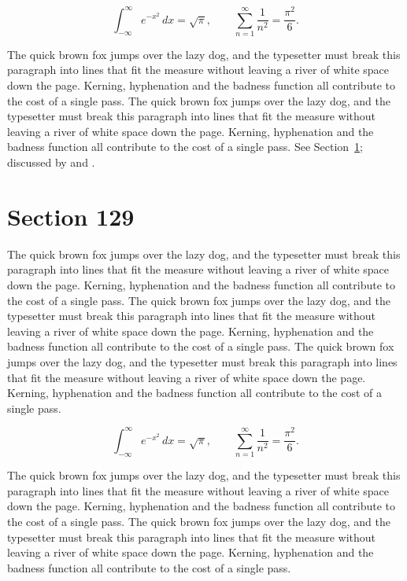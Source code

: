 \documentclass{article}
\begin{document}
\begin{equation}\label{eq:128}
\int_{-\infty}^{\infty} e^{-x^{2}}\,dx = \sqrt{\pi}, \qquad
\sum_{n=1}^{\infty} \frac{1}{n^{2}} = \frac{\pi^{2}}{6}.
\end{equation}

The quick brown fox jumps over the lazy dog, and the typesetter must break this paragraph into lines that fit the measure without leaving a river of white space down the page. Kerning, hyphenation and the badness function all contribute to the cost of a single pass. The quick brown fox jumps over the lazy dog, and the typesetter must break this paragraph into lines that fit the measure without leaving a river of white space down the page. Kerning, hyphenation and the badness function all contribute to the cost of a single pass. 
See Section~\ref{sec:129}; discussed by \textcite{k4} and \textcite{l1}.
\section{Section 129}
\label{sec:129}
The quick brown fox jumps over the lazy dog, and the typesetter must break this paragraph into lines that fit the measure without leaving a river of white space down the page. Kerning, hyphenation and the badness function all contribute to the cost of a single pass. The quick brown fox jumps over the lazy dog, and the typesetter must break this paragraph into lines that fit the measure without leaving a river of white space down the page. Kerning, hyphenation and the badness function all contribute to the cost of a single pass. The quick brown fox jumps over the lazy dog, and the typesetter must break this paragraph into lines that fit the measure without leaving a river of white space down the page. Kerning, hyphenation and the badness function all contribute to the cost of a single pass. 

\begin{equation}\label{eq:129}
\int_{-\infty}^{\infty} e^{-x^{2}}\,dx = \sqrt{\pi}, \qquad
\sum_{n=1}^{\infty} \frac{1}{n^{2}} = \frac{\pi^{2}}{6}.
\end{equation}

The quick brown fox jumps over the lazy dog, and the typesetter must break this paragraph into lines that fit the measure without leaving a river of white space down the page. Kerning, hyphenation and the badness function all contribute to the cost of a single pass. The quick brown fox jumps over the lazy dog, and the typesetter must break this paragraph into lines that fit the measure without leaving a river of white space down the page. Kerning, hyphenation and the badness function all contribute to the cost of a single pass. 
\end{document}
